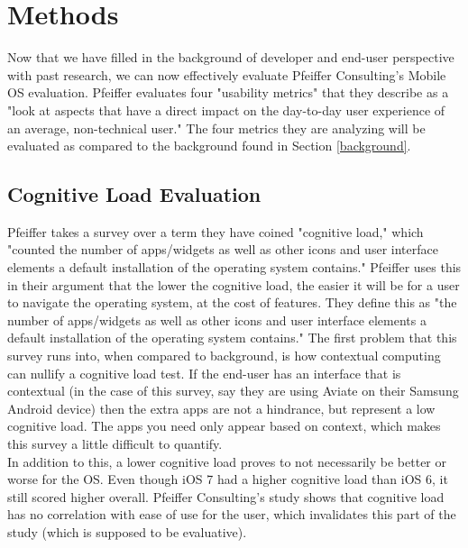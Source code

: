 \documentclass[11pt]{article}
\begin{document}

\section{Methods}
Now that we have filled in the background of developer and end-user perspective with past research, we can now effectively evaluate Pfeiffer Consulting's Mobile OS evaluation. Pfeiffer evaluates four "usability metrics" that they describe as a "look at aspects that have a direct impact on the day-to-day user experience of an average, non-technical user." \cite{Pfeiffer} The four metrics they are analyzing will be evaluated as compared to the background found in Section \ref{background}.
\subsection{Cognitive Load Evaluation}
Pfeiffer takes a survey over a term they have coined "cognitive load," which "counted
the number of apps/widgets as well as other icons and user interface elements a default installation of the operating system contains." \cite{Pfeiffer} Pfeiffer uses this in their argument that the lower the cognitive load, the easier it will be for a user to navigate the operating system, at the cost of features. They define this as "the number of apps/widgets as well as other icons and user interface elements a default installation of the operating system contains." \cite{Pfeiffer} The first problem that this survey runs into, when compared to background, is how contextual computing can nullify a cognitive load test. If the end-user has an interface that is contextual (in the case of this survey, say they are using Aviate on their Samsung Android device) then the extra apps are not a hindrance, but represent a low cognitive load. The apps you need only appear based on context, which makes this survey a little difficult to quantify. \\
\indent In addition to this, a lower cognitive load proves to not necessarily be better or worse for the OS. Even though iOS 7 had a higher cognitive load than iOS 6, it still scored higher overall. Pfeiffer Consulting's study shows that cognitive load has no correlation with ease of use for the user, which invalidates this part of the study (which is supposed to be evaluative).
\end{document}
